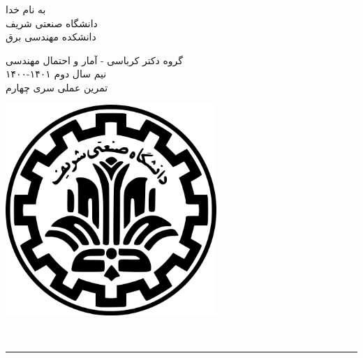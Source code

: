 \documentclass[a4paper]{article}
\begin{document}
\begin{minipage}{0.6\textwidth}
\begin{bf}
\begin{center}
	به نام خدا\\
	\vspace{0.25cm}
	دانشگاه صنعتی شریف\\
	\vspace{0.25cm}
	دانشکده مهندسی برق\\
	\vspace{0.5cm}

\large
گروه دکتر کرباسی - آمار و احتمال مهندسی \\
نیم سال دوم
۱۴۰۱-۱۴۰۰\\
\Large
\vspace{0.4cm}
تمرین عملی سری چهارم \\
\end{center}
\end{bf}
\normalsize
\end{minipage} \hfill
\begin{minipage}{0.35\textwidth}
\begin{flushleft}
\includegraphics[width=0.6\textwidth]{Shariflogo.png}\\ \large
\end{flushleft}

 \end{minipage}
\\

\rule[0.1\baselineskip]{\textwidth}{1.5pt}

\large
\end{document}
